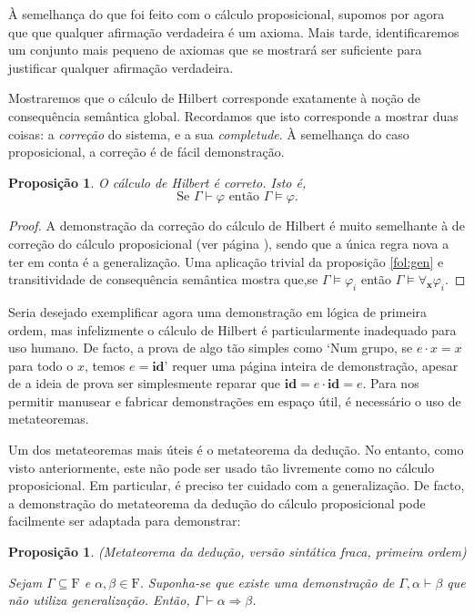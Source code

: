 \documentclass{report}
\newtheorem{prop}{Proposição}
\newtheorem*{prop*}{Proposição}
\theoremstyle{definition}
\theoremstyle{remark}
\renewcommand{\bf}[1]{\mathbf{#1}}
\newcommand{\F}{\mathrm{F}}
\newcommand{\imply}{\mathbin{\Rightarrow}}
\begin{document}
	À semelhança do que foi feito com o cálculo proposicional, supomos por agora que que qualquer afirmação verdadeira é um axioma. Mais tarde, identificaremos um conjunto mais pequeno de axiomas que se mostrará ser suficiente para justificar qualquer afirmação verdadeira.
	
	Mostraremos que o cálculo de Hilbert corresponde exatamente à noção de consequência semântica global. Recordamos que isto corresponde a mostrar duas coisas: a \emph{correção} do sistema, e a sua \emph{completude}. À semelhança do caso proposicional, a correção é de fácil demonstração.
	
	\begin{prop}
	O cálculo de Hilbert é correto. Isto é,
	\[\text{Se } \Gamma \vdash \varphi \text{ então } \Gamma \vDash \varphi.\]
	\end{prop}

	\begin{proof}
	A demonstração da correção do cálculo de Hilbert é muito semelhante à de correção do cálculo proposicional (ver página \pageref{prop:correcao}), sendo que a única regra nova a ter em conta é a generalização. Uma aplicação trivial da proposição \ref{fol:gen} e transitividade de consequência semântica mostra que,se $\Gamma \vDash \varphi_i$ então $\Gamma \vDash \forall_{\bf x} \varphi_i$.
	\end{proof}
	
	Seria desejado exemplificar agora uma demonstração em lógica de primeira ordem, mas infelizmente o cálculo de Hilbert é particularmente inadequado para uso humano. De facto, a prova de algo tão simples como `Num grupo, se $e \cdot x = x$ para todo o $x$, temos $e = \textbf{id}$' requer uma página inteira de demonstração, apesar de a ideia de prova ser simplesmente reparar que $\textbf{id} = e \cdot \textbf{id} = e$. Para nos permitir manusear e fabricar demonstrações em espaço útil, é necessário o uso de metateoremas.
	
	Um dos metateoremas mais úteis é o metateorema da dedução. No entanto, como visto anteriormente, este não pode ser usado tão livremente como no cálculo proposicional. Em particular, é preciso ter cuidado com a generalização. De facto, a demonstração do metateorema da dedução do cálculo proposicional pode facilmente ser adaptada para demonstrar:
	
	\begin{prop*}
	(Metateorema da dedução, versão sintática fraca, primeira ordem)
	
	Sejam $\Gamma \subseteq \F$ e $\alpha, \beta \in \F$. Suponha-se que existe uma demonstração de $\Gamma, \alpha \vdash \beta$ que não utiliza generalização. Então, $\Gamma \vdash \alpha \imply \beta$.
	\end{prop*}
	
\end{document}
